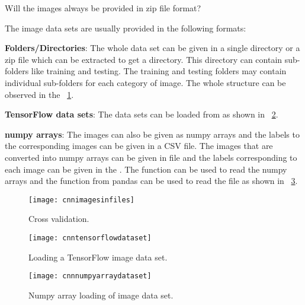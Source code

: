 	\begin{qanda}
		\begin{question}
Will the images always be provided in zip file format?
		\end{question}
		\begin{answer}
The image data sets are usually provided in the following formats:

	\begin{bulletedlist}
		\item {\bfseries Folders/Directories}: The whole data set can be given in a single directory or a zip file which can be extracted to get a directory. This directory can contain sub-folders like training and testing. The training and testing folders may contain individual sub-folders for each category of image. The whole structure can be observed in the \figurename~\ref{fig:cnnimagesinfiles}.
		\item {\bfseries TensorFlow data sets}: The data sets can be loaded from as shown in \figurename~\ref{fig:cnntensorflowdataset}.
		\item {\bfseries numpy arrays}: The images can also be given as numpy arrays and the labels to the corresponding images can be given in a CSV file.  The images that are converted into numpy arrays can be given in  file and the labels corresponding to each image can be given in the .  The  function can be used to read the numpy arrays and the  function from pandas can be used to read the  file as shown in \figurename~\ref{fig:cnnnumpyarraydataset}.
	\end{bulletedlist}
		\end{answer}
	\end{qanda}

	\begin{figure}[h]
		\centering
		\texttt{[image: cnnimagesinfiles]}
		\caption[Cross validation]{Cross validation.}
		\label{fig:cnnimagesinfiles}
	\end{figure}

	\begin{figure}[h]
		\centering
		\texttt{[image: cnntensorflowdataset]}
		\caption[Loading a TensorFlow image data set]{Loading a TensorFlow image data set.}
		\label{fig:cnntensorflowdataset}
	\end{figure}

	\begin{figure}[h]
		\centering
		\texttt{[image: cnnnumpyarraydataset]}
		\caption[Numpy array loading of image data set]{Numpy array loading of image data set.}
		\label{fig:cnnnumpyarraydataset}
	\end{figure}

